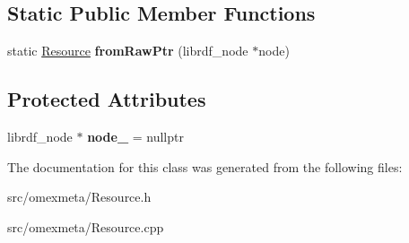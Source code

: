 \subsection*{Static Public Member Functions}
\begin{DoxyCompactItemize}
\item 
\mbox{\label{classomexmeta_1_1Resource_a4b8f2429e43312eab63b5135fd508986}} 
static \hyperlink{classomexmeta_1_1Resource}{Resource} {\bfseries from\+Raw\+Ptr} (librdf\+\_\+node $\ast$node)
\end{DoxyCompactItemize}
\subsection*{Protected Attributes}
\begin{DoxyCompactItemize}
\item 
\mbox{\label{classomexmeta_1_1Resource_a9695da843dd795e090f8b89886d432b9}} 
librdf\+\_\+node $\ast$ {\bfseries node\+\_\+} = nullptr
\end{DoxyCompactItemize}


The documentation for this class was generated from the following files\+:\begin{DoxyCompactItemize}
\item 
src/omexmeta/Resource.\+h\item 
src/omexmeta/Resource.\+cpp\end{DoxyCompactItemize}

